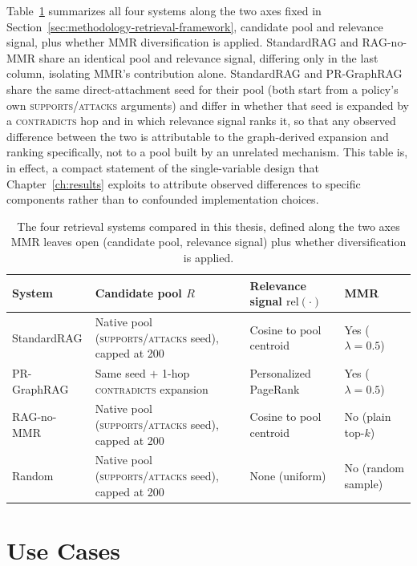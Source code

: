 Table~\ref{tab:systems-summary} summarizes all four systems along the two axes fixed in
Section~\ref{sec:methodology-retrieval-framework}, candidate pool and relevance signal, plus
whether MMR diversification is applied. StandardRAG and RAG-no-MMR share an identical pool and
relevance signal, differing only in the last column, isolating MMR's contribution alone.
StandardRAG and PR-GraphRAG share the same direct-attachment seed for their pool (both start from
a policy's own \textsc{supports}/\textsc{attacks} arguments) and differ in whether that seed is
expanded by a \textsc{contradicts} hop and in which relevance signal ranks it, so that any
observed difference between the two is attributable to the graph-derived expansion and ranking
specifically, not to a pool built by an unrelated mechanism. This table is, in effect, a compact
statement of the single-variable design that Chapter~\ref{ch:results} exploits to attribute
observed differences to specific components rather than to confounded implementation choices.

\begin{table}[htbp]
\centering
\small
\caption{The four retrieval systems compared in this thesis, defined along the two axes MMR
leaves open (candidate pool, relevance signal) plus whether diversification is applied.}
\label{tab:systems-summary}
\begin{tabular}{@{}p{2.1cm}p{3.6cm}p{2.9cm}p{1.7cm}@{}}
\toprule
\textbf{System} & \textbf{Candidate pool $R$} & \textbf{Relevance signal $\mathrm{rel}(\cdot)$} & \textbf{MMR} \\
\midrule
StandardRAG & Native pool (\textsc{supports}/\textsc{attacks} seed), capped at 200 & Cosine to pool centroid & Yes ($\lambda=0.5$) \\
PR-GraphRAG & Same seed $+$ 1-hop \textsc{contradicts} expansion & Personalized PageRank & Yes ($\lambda=0.5$) \\
RAG-no-MMR & Native pool (\textsc{supports}/\textsc{attacks} seed), capped at 200 & Cosine to pool centroid & No (plain top-$k$) \\
Random & Native pool (\textsc{supports}/\textsc{attacks} seed), capped at 200 & None (uniform) & No (random sample) \\
\bottomrule
\end{tabular}
\end{table}

\section{Use Cases}
\label{sec:methodology-usecases}

